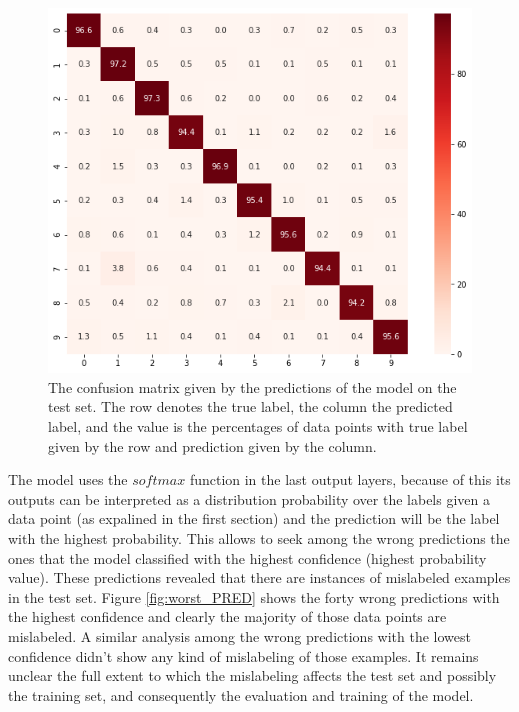 \documentclass[12pt]{article}
\begin{document}
\begin{figure}[h]
	\centering
	\includegraphics[width=.7\textwidth]{confusion_matrix}
	\caption{The confusion matrix  given by the predictions of the model on the test set. The row denotes the true label, the column the predicted label, and the value is the percentages of data points with true label given by the row and prediction given by the column.}
	\label{fig:conf_mat}
\end{figure}

The model uses the $softmax$ function in the last output layers, because of this its outputs can be interpreted as a distribution probability over the labels given a data point (as expalined in the first section) and the prediction will be the label with the highest probability. This allows to seek among the wrong predictions the ones that the model classified with the highest confidence (highest probability value). These predictions revealed that there are instances of mislabeled examples in the test set. Figure \ref{fig:worst_PRED} shows the forty wrong predictions with the highest confidence and clearly the majority of those data points are mislabeled. A similar analysis among the wrong predictions with the lowest confidence didn't show any kind of mislabeling of those examples. It remains unclear the full extent to which the mislabeling affects the test set and possibly the training set, and consequently the evaluation and training of the model.
\end{document}

